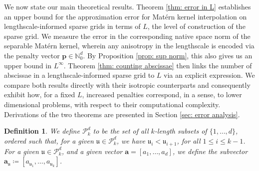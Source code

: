 \documentclass[pdflatex,sn-mathphys-num]{sn-jnl}%
\theoremstyle{thmstyleone}%
\theoremstyle{thmstyletwo}%
\theoremstyle{thmstylethree}%
\newtheorem{definition}{Definition}%
\begin{document}
We now state our main theoretical results. Theorem \ref{thm: error in L} establishes an upper bound for the approximation error for Mat\'ern kernel interpolation on lengthscale-informed sparse grids in terms of \(L\), the level of construction of the sparse grid. We measure the error in the corresponding native space norm of the separable Mat\'ern kernel, wherein any anisotropy in the lengthscale is encoded via the penalty vector \(\mathbf{p}\in\mathbb{N}_0^d\). By Proposition \ref{prop: sup norm}, this also gives us an upper bound in \(L^\infty\). Theorem \ref{thm: counting abscissae} then links the number of abscissae in a lengthscale-informed sparse grid to \(L\) via an explicit expression. We compare both results directly with their isotropic counterparts and consequently exhibit how, for a fixed \(L\), increased penalties correspond, in a sense, to lower dimensional problems, with respect to their computational complexity. Derivations of the two theorems are presented in Section \ref{sec: error analysis}.
\begin{definition} We define \(\mathcal{P}_k^d\) to be the set of all \(k\)-length subsets of \(\{1,\dots,d\}\), ordered such that, for a given \(\mathfrak{u}\in\mathcal{P}^d_k\), we have \(\mathfrak{u}_i<\mathfrak{u}_{i+1}\), for all \(1\leq i\leq k-1\). For a given \(\mathfrak{u}\in\mathcal{P}^d_k\), and a given vector \(\mathbf{a}=[a_1,\dots,a_d]\), we define the subvector \(\mathbf{a}_{\mathfrak{u}}\coloneqq[a_{\mathfrak{u}_1},\dots,a_{\mathfrak{u}_k}]\).
    
\end{definition}
\end{document}
